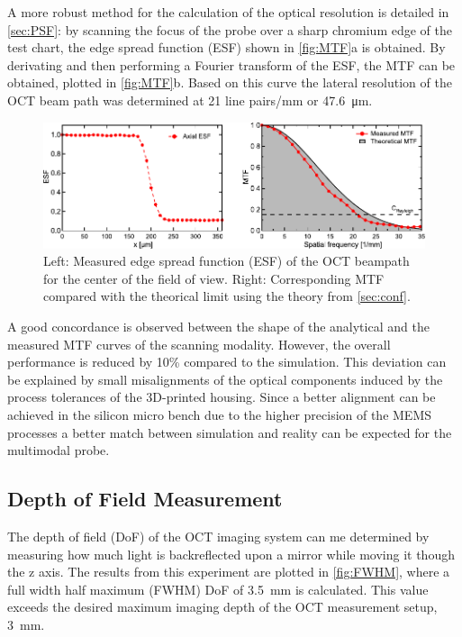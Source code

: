 A more robust method for the calculation of the optical resolution is detailed in \autoref{sec:PSF}: by scanning the focus of the probe over a sharp chromium edge of the test chart, the edge spread function (ESF) shown in \autoref{fig:MTF}a is obtained. By derivating and then performing a Fourier transform of the ESF, the MTF can be obtained, plotted in \autoref{fig:MTF}b. Based on this curve the lateral resolution of the OCT beam path was determined at 21 line pairs/mm or \SI{47.6}{\micro\meter}. 
\begin{figure}[h!]\centering \includegraphics{figures/50_Measurements/conf/res/confResMeas.pdf}
      \caption{Left: Measured edge spread function (ESF) of the OCT beampath for the center of the field of view. 
      Right: Corresponding MTF compared with the theorical limit using the theory from \autoref{sec:conf}.}
      \label{fig:MTF}
\end{figure}
A good concordance is observed between the shape of the analytical and the measured MTF curves of the scanning modality. However, the overall performance is reduced by 10\% compared to the simulation. This deviation can be explained by small misalignments of the optical components induced by the process tolerances of the 3D-printed housing. Since a better alignment can be achieved in the silicon micro bench due to the higher precision of the MEMS processes a better match between simulation and reality can be expected for the multimodal probe.

\subsection{Depth of Field Measurement}
The depth of field (DoF) of the OCT imaging system can me determined by measuring how much light is backreflected upon a mirror while moving it though the z axis. The results from this experiment are plotted in \autoref{fig:FWHM}, where a full width half maximum (FWHM) DoF of \SI{3.5}{\milli\meter} is calculated. This value exceeds the desired maximum imaging depth of the OCT measurement setup, \SI{3}{\milli\meter}. 

